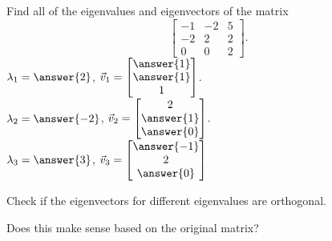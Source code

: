 \documentclass{ximera}
\begin{document}
\begin{exercise}
    Find all of the eigenvalues and eigenvectors of the matrix
    \[ 
        \begin{bmatrix} 
            -1 & -2 & 5 \\ 
            -2 & 2 & 2 \\ 
            0 & 0 & 2 
        \end{bmatrix}. 
    \]
    $\lambda_1 = \answer{2}$, $\vec{v}_1 = \begin{bmatrix} \answer{1} \\ \answer{1} \\ 1 \end{bmatrix}$. \\
    $\lambda_2 = \answer{-2}$, $\vec{v}_2 = \begin{bmatrix} 2 \\ \answer{1} \\ \answer{0} \end{bmatrix}$.  \\
    $\lambda_3 = \answer{3}$, $\vec{v}_3 = \begin{bmatrix} \answer{-1} \\ 2 \\ \answer{0} \end{bmatrix}$
    \begin{problem}
        Check if the eigenvectors for different eigenvalues are orthogonal. 
        \begin{multipleChoice}
        \end{multipleChoice}
        \begin{problem}
            Does this make sense based on the original matrix? 
        \end{problem}
    \end{problem}
\end{exercise}
\end{document}
